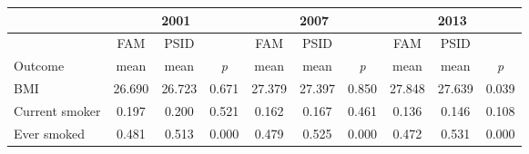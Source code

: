 \begin{tabular}{p{1.2in}*{3}{c}*{3}{c}*{3}{c}}
\hline
 \multicolumn{1}{c}{} & \multicolumn{3}{c}{2001} & \multicolumn{3}{c}{2007} & \multicolumn{3}{c}{2013} \\
\hline
 \multicolumn{1}{c}{} & FAM & PSID & & FAM & PSID & & FAM & PSID & \\
 \multicolumn{1}{l}{Outcome} & mean & mean & \textit{p} & mean & mean & \textit{p} & mean & mean & \textit{p} \\
\hline
BMI&26.690&26.723&0.671&27.379&27.397&0.850&27.848&27.639&0.039\\
Current smoker&0.197&0.200&0.521&0.162&0.167&0.461&0.136&0.146&0.108\\
Ever smoked&0.481&0.513&0.000&0.479&0.525&0.000&0.472&0.531&0.000\\
\hline
\end{tabular}
